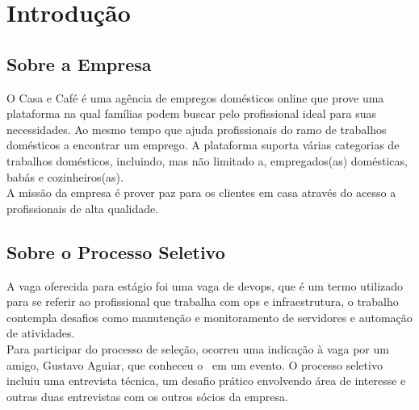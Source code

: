 \chapter{Introdução}\label{chap:intro}

\section{Sobre a Empresa}

O Casa e Café é uma agência de empregos domésticos online que prove uma plataforma na qual famílias podem buscar pelo profissional ideal para suas necessidades. Ao mesmo tempo que ajuda profissionais do ramo de trabalhos domésticos a encontrar um emprego. A plataforma suporta várias categorias de trabalhos domésticos, incluindo, mas não limitado a, empregados(as) domésticas, babás e cozinheiros(as).\\

A missão da empresa é prover paz para os clientes em casa através do acesso a profissionais de alta qualidade.\\



\section{Sobre o Processo Seletivo}

A vaga oferecida para estágio foi uma vaga de \gls{devops}, que é um termo utilizado para se referir ao profissional que trabalha com \gls{ops} e infraestrutura, o trabalho contempla desafios como manutenção e monitoramento de servidores e automação de atividades.\\

Para participar do processo de seleção, ocorreu uma indicação à vaga por um amigo, Gustavo Aguiar, que conheceu o \nomeSupervisor~em um evento. O processo seletivo incluiu uma entrevista técnica, um desafio prático envolvendo área de interesse e outras duas entrevistas com os outros sócios da empresa.\\

